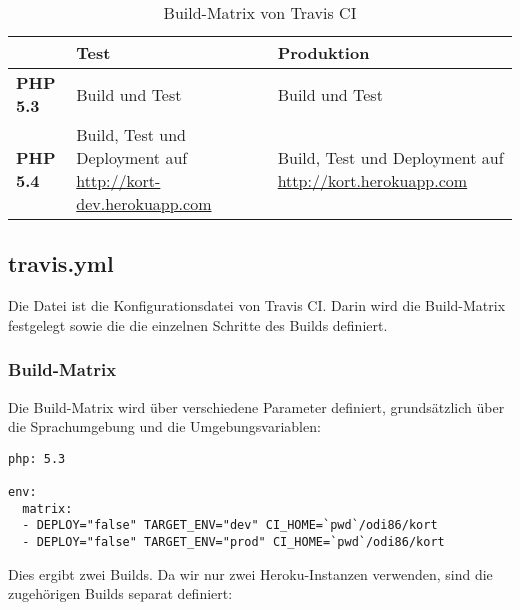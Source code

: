 \begin{table}[H]
\centering
\begin{tabular}{|p{0.2\threecelltabwidth}|p{0.4\threecelltabwidth}|p{0.4\threecelltabwidth}|}
\hline 
 & \textbf{Test} & \textbf{Produktion} \\
\hline 
\textbf{PHP 5.3} & Build und Test & Build und Test \\
\hline 
\textbf{PHP 5.4} & Build, Test und Deployment auf \url{http://kort-dev.herokuapp.com} & Build, Test und Deployment auf \url{http://kort.herokuapp.com} \\
\hline 
\end{tabular} 
\caption{Build-Matrix von Travis CI}
\label{infrastruktur-build-matrix}
\end{table}

\subsection{travis.yml}
Die  Datei ist die Konfigurationsdatei von Travis CI.
Darin wird die Build-Matrix festgelegt sowie die die einzelnen Schritte des Builds definiert.

\subsubsection{Build-Matrix}
Die Build-Matrix wird über verschiedene Parameter definiert, grundsätzlich über die Sprachumgebung und die Umgebungsvariablen:

\lstset{language=XML}
\begin{lstlisting}[float, caption=Build-Matrix definiert in .travis.yml, label=travis-yml-build-matrix]
php: 5.3

env:
  matrix:
  - DEPLOY="false" TARGET_ENV="dev" CI_HOME=`pwd`/odi86/kort
  - DEPLOY="false" TARGET_ENV="prod" CI_HOME=`pwd`/odi86/kort
\end{lstlisting}

Dies ergibt zwei Builds. Da wir nur zwei Heroku-Instanzen verwenden, sind die zugehörigen Builds separat definiert:

